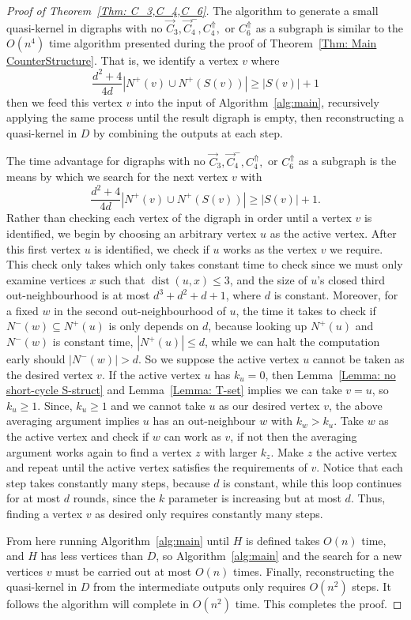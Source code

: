 \documentclass[12pt]{article}
\theoremstyle{definition}
\DeclareMathOperator{\dist}{dist}
\begin{document}
\begin{proof}[Proof of Theorem~\ref{Thm: C_3,C_4,C_6}]
    The algorithm to generate a small quasi-kernel in digraphs with no 
    $\Vec{C}_3, \Vec{C}^{-}_4,C_4^{\Uparrow},$ or $C_6^{\Uparrow}$ as a subgraph
    is similar to the $O(n^4)$ time algorithm
    presented during the proof of Theorem~\ref{Thm: Main CounterStructure}.
    That is, we identify a vertex $v$ where 
    \[
    \frac{d^2+4}{4d}|N^+(v) \cup N^+(S(v))| \geq |S(v)|+1
    \]
    then we feed this vertex $v$ into the input of Algorithm~\ref{alg:main}, 
    recursively applying the same process until the result digraph is empty, then reconstructing
    a quasi-kernel in $D$ by combining the outputs at each step.
    
    The time advantage for digraphs with no $\Vec{C}_3, \Vec{C}^{-}_4,C_4^{\Uparrow},$ or $C_6^{\Uparrow}$ as a subgraph
    is the means by which we search for the next vertex $v$
    with 
    \[
    \frac{d^2+4}{4d}|N^+(v) \cup N^+(S(v))| \geq |S(v)|+1.
    \]
    Rather than checking each vertex of the digraph in order until a vertex $v$
    is identified, we begin by choosing an arbitrary vertex $u$ as the active vertex.
    After this first vertex $u$ is identified, 
    we check if $u$ works as the vertex $v$ we require.
    This check only takes 
    which only takes constant time to check since
    we must only examine vertices $x$ such that $\dist(u,x)\leq 3$,
    and
    the size of $u$'s closed third out-neighbourhood is at most $d^3+d^2+d+1$, where $d$ is constant.
    Moreover, for a fixed $w$ in the second out-neighbourhood of $u$, the time it takes to check if $N^-(w)\subseteq N^+(u)$
    is only depends on $d$, because looking up $N^+(u)$ and $N^-(w)$ is constant time, 
    $|N^+(u)|\leq d$, while we can halt the computation early should $|N^-(w)|>d$.
    So we suppose the active vertex $u$ cannot be taken as the desired vertex $v$.
    If the active vertex $u$ has $k_u = 0$, then 
    Lemma~\ref{Lemma: no short-cycle S-struct} and Lemma~\ref{Lemma: T-set}
    implies we can take $v = u$, so $k_u\geq 1$.
    Since, $k_u \geq 1$ and we cannot take $u$ as our desired vertex $v$,
    the above averaging argument implies $u$ has an out-neighbour $w$ with $k_w>k_u$.
    Take $w$ as the active vertex and check if $w$ can work as $v$, if not then 
    the averaging argument works again to find a vertex $z$ with larger $k_z$. 
    Make $z$ the active vertex and repeat until the active vertex satisfies the requirements of $v$.
    Notice that each step takes constantly many steps, because $d$ is constant, 
    while this loop continues for at most $d$ rounds, since the $k$ parameter is increasing but at most $d$.
    Thus, finding a vertex $v$ as desired only requires constantly many steps.

    From here running Algorithm~\ref{alg:main} until $H$ is defined takes $O(n)$ time,
    and $H$ has less vertices than $D$, so Algorithm~\ref{alg:main} and the search for a new vertices $v$ must be carried out at most $O(n)$ times.
    Finally, reconstructing the quasi-kernel in $D$ from the intermediate outputs only requires $O(n^2)$ steps.
    It follows the algorithm will complete in $O(n^2)$ time.
    This completes the proof.
\end{proof}
\end{document}
